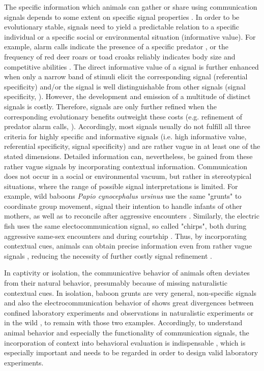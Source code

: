 The specific information which animals can gather or share using communication signals depends to some extent on specific signal properties \citep{Seyfarth2003}. In order to be evolutionary stable, signals need to yield a predictable relation to a specific individual or a specific social or environmental situation (informative value). For example, alarm calls indicate the presence of a specific predator \citep{Seyfarth1980}, or the frequency of red deer roars or toad croaks reliably indicates body size and competitive abilities \citep{Davies1978, Reby2005}. The direct informative value of a signal is further enhanced when only a narrow band of stimuli elicit the corresponding signal (referential specificity) and/or the signal is well distinguishable from other signals (signal specificity, \citealp{Seyfarth2003}). However, the development and emission of a multitude of distinct signals is costly. Therefore, signals are only further refined when the corresponding evolutionary benefits outweight these costs (e.g. refinement of predator alarm calls, \citealp{Schibler2007}). Accordingly, most signals usually do not fulfill all three criteria for highly specific and informative signals (i.e. high informative value, referential specificity, signal specificity) and are rather vague in at least one of the stated dimensions. Detailed information can, nevertheless, be gained from these rather vague signals by incorporating contextual information. Communication does not occur in a social or environmental vacuum, but rather in stereotypical situations, where the range of possible signal interpretations is limited. For example, wild baboons \textit{Papio cynocephalus ursinus} use the same "grunts" to coordinate group movement, signal their intention to handle infants of other mothers, as well as to reconcile after aggressive encounters \citep{Cheney1995, Rendall1999}. Similarly, the electric fish \Lepto{} uses the same electocommunication signal, so called "chirps", both during aggressive same-sex encounters and during courtship \citep{Henninger2018}. Thus, by incorporating contextual cues, animals can obtain precise information even from rather vague signals \citep{Seyfarth2017}, reducing the necessity of further costly signal refinement \citep{Schibler2007}.

In captivity or isolation, the communicative behavior of animals often deviates from their natural behavior, presumably because of missing naturalistic contextual cues. In isolation, baboon grunts are very general, non-specific signals \citep{Cheney1995, Rendall1999} and also the electrocommunication behavior of \lepto{} shows great divergences between confined laboratory experiments and observations in naturalistic experiments or in the wild \citep{Henninger2018}, to remain with those two examples. Accordingly, to understand animal behavior and especially the functionality of communication signals, the incorporation of context into behavioral evaluation is indispensable \citep{Seyfarth2017}, which is especially important and needs to be regarded in order to design valid laboratory experiments.

